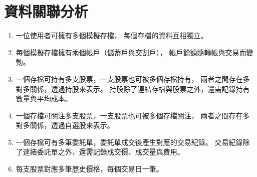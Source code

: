 \documentclass[UTF8, a4paper, 12pt, fontset=none]{ctexart}
\begin{document}
    \section{資料關聯分析}
    \begin{enumerate}
        \item 一位使用者可擁有多個模擬存檔，
        每個存檔的資料互相獨立。

        \item 每個模擬存檔擁有兩個帳戶（儲蓄戶與交割戶），
        帳戶餘額隨轉帳與交易而變動。

        \item 一個存檔可持有多支股票，一支股票也可被多個存檔持有，
        兩者之間存在多對多關係，透過持股來表示。
        持股除了連結存檔與股票之外，還需記錄持有數量與平均成本。

        \item 一個存檔可關注多支股票，一支股票也可被多個存檔關注，
        兩者之間存在多對多關係，透過自選股來表示。

        \item 一個存檔可有多筆委託單，委託單成交後產生對應的交易紀錄。
        交易紀錄除了連結委託單之外，還需記錄成交價、成交量與費用。

        \item 每支股票對應多筆歷史價格，每個交易日一筆。

    \end{enumerate}
\end{document}
